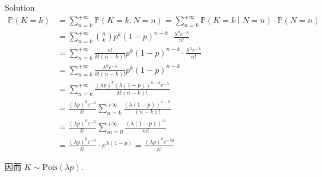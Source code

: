 \begin{qlsolution}{Solution}
\[\begin{matrix}
{\mathbb{P}(\mathit{K} = \mathit{k})} & \left. = \sum\limits_{\mathit{n} = \mathit{k}}^{+ \infty}\mathbb{P}(\mathit{K} = \mathit{k},\mathit{N} = \mathit{n}) = \sum\limits_{\mathit{n} = \mathit{k}}^{+ \infty}\mathbb{P}(\mathit{K} = \mathit{k} \middle| \mathit{N} = \mathit{n}) \cdot \mathbb{P}(\mathit{N} = \mathit{n}) \right. \\
 & {= \sum\limits_{\mathit{n} = \mathit{k}}^{+ \infty}\binom{\mathit{n}}{\mathit{k}}\mathit{p}^{\mathit{k}}(1 - \mathit{p})^{\mathit{n} - \mathit{k}} \cdot \frac{\mathit{\lambda}^{\mathit{n}}\mathit{e}^{- \mathit{\lambda}}}{\mathit{n}!}} \\
 & {= \sum\limits_{\mathit{n} = \mathit{k}}^{+ \infty}\frac{\mathit{n}!}{\mathit{k}!(\mathit{n} - \mathit{k})!}\mathit{p}^{\mathit{k}}(1 - \mathit{p})^{\mathit{n} - \mathit{k}} \cdot \frac{\mathit{\lambda}^{\mathit{n}}\mathit{e}^{- \mathit{\lambda}}}{\mathit{n}!}} \\
 & {= \sum\limits_{\mathit{n} = \mathit{k}}^{+ \infty}\frac{\mathit{\lambda}^{\mathit{n}}\mathit{e}^{- \mathit{\lambda}}}{\mathit{k}!(\mathit{n} - \mathit{k})!}\mathit{p}^{\mathit{k}}(1 - \mathit{p})^{\mathit{n} - \mathit{k}}} \\
 & {= \sum\limits_{\mathit{n} = \mathit{k}}^{+ \infty}\frac{(\mathit{\lambda}\mathit{p})^{\mathit{k}}(\mathit{\lambda}(1 - \mathit{p}))^{\mathit{n} - \mathit{k}}\mathit{e}^{- \mathit{\lambda}}}{\mathit{k}!(\mathit{n} - \mathit{k})!}} \\
 & {= \frac{(\mathit{\lambda}\mathit{p})^{\mathit{k}}\mathit{e}^{- \mathit{\lambda}}}{\mathit{k}!}\sum\limits_{\mathit{n} = \mathit{k}}^{+ \infty}\frac{(\mathit{\lambda}(1 - \mathit{p}))^{\mathit{n} - \mathit{k}}}{(\mathit{n} - \mathit{k})!}} \\
 & {= \frac{(\mathit{\lambda}\mathit{p})^{\mathit{k}}\mathit{e}^{- \mathit{\lambda}}}{\mathit{k}!}\sum\limits_{\mathit{m} = 0}^{+ \infty}\frac{(\mathit{\lambda}(1 - \mathit{p}))^{\mathit{m}}}{\mathit{m}!}} \\
 & {= \frac{(\mathit{\lambda}\mathit{p})^{\mathit{k}}\mathit{e}^{- \mathit{\lambda}}}{\mathit{k}!} \cdot \mathit{e}^{\mathit{\lambda}(1 - \mathit{p})} = \frac{(\mathit{\lambda}\mathit{p})^{\mathit{k}}\mathit{e}^{- \mathit{\lambda}\mathit{p}}}{\mathit{k}!}}
\end{matrix}\]

因而 \(\mathit{K} \sim \text{Pois}(\mathit{\lambda}\mathit{p})\).

\end{qlsolution}

